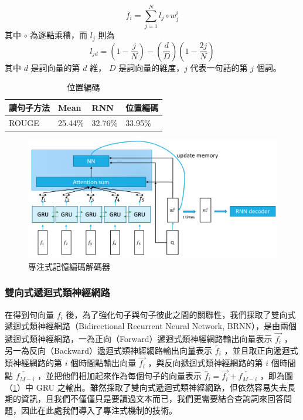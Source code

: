 \begin{equation}
    f_i = \sum_{j=1}^N l_j \circ w_j^i
\end{equation}
其中 $\circ$ 為逐點乘積，而 $l_j$ 則為
\begin{equation}
    l_{jd} = (1 - \frac{j}{N}) - (\frac{d}{D})(1 - \frac{2j}{N}) \label{PE}
\end{equation}
其中 $d$ 是詞向量的第 $d$ 維， $D$ 是詞向量的維度，$j$ 代表一句話的第 $j$ 個詞。

\begin{table}
    \caption{位置編碼}
    \label{table:position}
    \centering
    \begin{tabular}{|l|l|l|l|}
    \hline
    讀句子方法 & Mean    & RNN     & 位置編碼 \\
    \hline
    ROUGE      & 25.44\% & 32.76\% & 33.95\% \\
    \hline
    \end{tabular}
\end{table}
\begin{figure}[h]
    \centering
    \includegraphics[scale=0.47]{images/chap3_dmn.png}
    \caption{專注式記憶編碼解碼器}\label{fig:dmn}
\end{figure}
\subsubsection{雙向式遞迴式類神經網路}
在得到句向量 $f_i$ 後，為了強化句子與句子彼此之間的關聯性，我們採取了雙向式遞迴式類神經網路（Bidirectional Recurrent Neural Network, BRNN），是由兩個遞迴式類神經網路，一為正向（Forward）遞迴式類神經網路輸出向量表示 $\overrightarrow{f_i}$ ，另一為反向（Backward）遞迴式類神經網路輸出向量表示 $\overleftarrow{f_i}$ ，並且取正向遞迴式類神經網路的第 $i$ 個時間點輸出向量 $\overrightarrow{f_i}$ ，與反向遞迴式類神經網路的第 $i$ 個時間點 $\overleftarrow{f_{M-i}}$ ，並把他們相加起來作為每個句子的向量表示 $\overleftrightarrow{f_i} = \overrightarrow{f_i} + \overleftarrow{f_{M-i}}$ ，即為圖（\ref{fig:dmn}）中 GRU 之輸出。雖然採取了雙向式遞迴式類神經網路，但依然容易失去長期的資訊，且我們不僅僅只是要讀過文本而已，我們更需要結合查詢詞來回答問題，因此在此處我們導入了專注式機制的技術。

